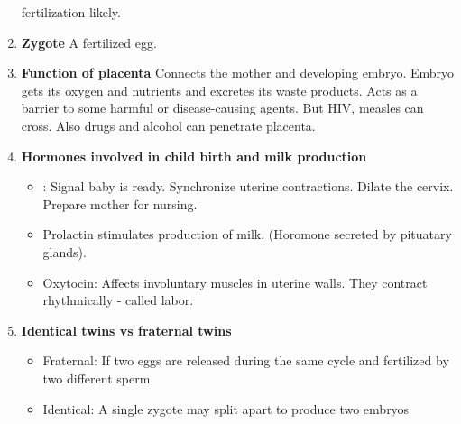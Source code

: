 \documentclass[9pt]{article}
\begin{document}
\begin{enumerate}
    fertilization likely.
  \item {\bf Zygote}
  A fertilized egg.
  \item {\bf Function of placenta} Connects the mother and developing
    embryo. Embryo gets its oxygen and nutrients and excretes its
    waste products. Acts as a barrier to some harmful or
    disease-causing agents. But HIV, measles can cross. Also drugs and
    alcohol can penetrate placenta.
  \item {\bf Hormones involved in child birth and milk production}
    \begin{itemize}
      \item: Signal baby is ready. Synchronize uterine
        contractions. Dilate the cervix. Prepare mother for nursing.
      \item Prolactin stimulates production of milk. (Horomone
        secreted by pituatary glands).
      \item Oxytocin: Affects involuntary muscles in uterine
        walls. They contract rhythmically - called labor.
    \end{itemize}    
  \item {\bf Identical twins vs fraternal twins}
    \begin{itemize}
    \item Fraternal: If two eggs are released during the same cycle
      and fertilized by two different sperm
    \item Identical: A single zygote may split apart to produce two
      embryos
    \end{itemize}
\end{enumerate}
\end{document}
